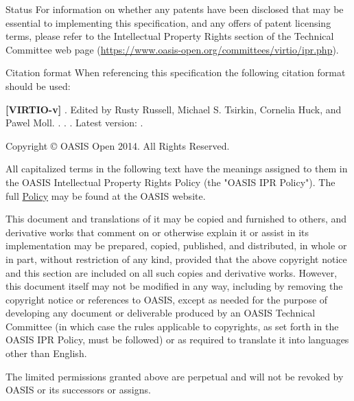 \begin{titlepage}
\begin{oasistitlesection}{Status}
For information on whether any patents have been disclosed that
may be essential to implementing this specification, and any
offers of patent licensing terms, please refer to the
Intellectual Property Rights section of the Technical Committee
web page (\url{https://www.oasis-open.org/committees/virtio/ipr.php}).
\end{oasistitlesection}


\begin{oasistitlesection}{Citation format}
When referencing this specification the following citation format should be used:\newline

\textbf{[VIRTIO-v\virtiorev]}\newline
\textit{\virtioversion}. Edited by Rusty Russell, Michael S.
Tsirkin, Cornelia Huck, and Pawel Moll. \virtioworkingdraftdate.
\virtiodraftoasisstagename \virtiodraftstageextra . \virtiourlhtml .
Latest version: \virtiourllatesthtml .
\end{oasistitlesection}

\vfill\newpage


Copyright © OASIS Open 2014. All Rights Reserved.

All capitalized terms in the following text have the meanings assigned
to them in the OASIS Intellectual Property Rights Policy (the "OASIS
IPR Policy"). The full \href{https://www.oasis-open.org/policies-guidelines/ipr}{Policy} may be found at the OASIS website.

This document and translations of it may be copied and furnished to
others, and derivative works that comment on or otherwise explain it
or assist in its implementation may be prepared, copied, published,
and distributed, in whole or in part, without restriction of any kind,
provided that the above copyright notice and this section are included
on all such copies and derivative works. However, this document itself
may not be modified in any way, including by removing the copyright
notice or references to OASIS, except as needed for the purpose of
developing any document or deliverable produced by an OASIS Technical
Committee (in which case the rules applicable to copyrights, as set
forth in the OASIS IPR Policy, must be followed) or as required to
translate it into languages other than English.

The limited permissions granted above are perpetual and will not be
revoked by OASIS or its successors or assigns.


\end{titlepage}
